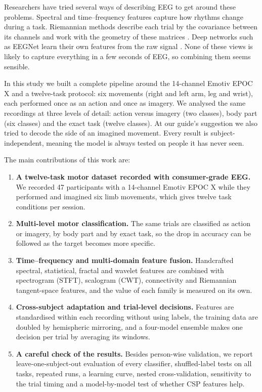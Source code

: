 \documentclass[pdflatex,sn-mathphys-num]{sn-jnl}%
\theoremstyle{thmstyleone}%
\theoremstyle{thmstyletwo}%
\theoremstyle{thmstylethree}%
\begin{document}
Researchers have tried several ways of describing EEG to get around these problems. Spectral and time--frequency features capture how rhythms change during a task. Riemannian methods describe each trial by the covariance between its channels and work with the geometry of these matrices \citep{Barachant2012,Congedo2017}. Deep networks such as EEGNet learn their own features from the raw signal \citep{Schirrmeister2017,Lawhern2018}. None of these views is likely to capture everything in a few seconds of EEG, so combining them seems sensible.

In this study we built a complete pipeline around the 14-channel Emotiv EPOC X and a twelve-task protocol: six movements (right and left arm, leg and wrist), each performed once as an action and once as imagery. We analysed the same recordings at three levels of detail: action versus imagery (two classes), body part (six classes) and the exact task (twelve classes). At our guide's suggestion we also tried to decode the side of an imagined movement. Every result is subject-independent, meaning the model is always tested on people it has never seen.

The main contributions of this work are:

\begin{enumerate}
\item \textbf{A twelve-task motor dataset recorded with consumer-grade EEG.} We recorded 47 participants with a 14-channel Emotiv EPOC X while they performed and imagined six limb movements, which gives twelve task conditions per session.

\item \textbf{Multi-level motor classification.} The same trials are classified as action or imagery, by body part and by exact task, so the drop in accuracy can be followed as the target becomes more specific.

\item \textbf{Time--frequency and multi-domain feature fusion.} Handcrafted spectral, statistical, fractal and wavelet features are combined with spectrogram (STFT), scalogram (CWT), connectivity and Riemannian tangent-space features, and the value of each family is measured on its own.

\item \textbf{Cross-subject adaptation and trial-level decisions.} Features are standardised within each recording without using labels, the training data are doubled by hemispheric mirroring, and a four-model ensemble makes one decision per trial by averaging its windows.

\item \textbf{A careful check of the results.} Besides person-wise validation, we report leave-one-subject-out evaluation of every classifier, shuffled-label tests on all tasks, repeated runs, a learning curve, nested cross-validation, sensitivity to the trial timing and a model-by-model test of whether CSP features help.
\end{enumerate}
\end{document}
